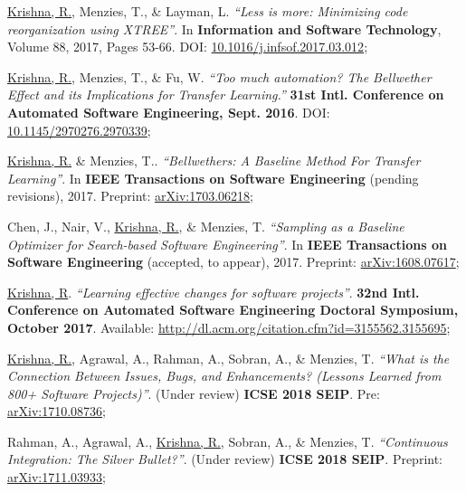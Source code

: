 \documentclass[letterpaper,9pt]{article}
\begin{document}
\begin{enumerate}[label={[\arabic*]}, leftmargin=15pt]

    \item\small \underline{Krishna, R.}, Menzies, T., \& Layman, L. 
    \textit{``Less is more: Minimizing code reorganization using XTREE''}. In 
    \textbf{Information and Software Technology}, Volume 88, 2017, Pages 53-66. 
    DOI:  
    \href{https://arxiv.org/abs/1609.03614}{10.1016/j.infsof.2017.03.012}\vspace{-6pt};
    
    \item\small  \underline{Krishna, R.}, Menzies, T., \& Fu, W. \textit{``Too 
    much automation? The Bellwether Effect and its Implications for Transfer 
    Learning.''} \textbf{31st Intl. Conference on Automated Software 
    Engineering, Sept. 2016}. DOI: 
    \href{https://doi.org/10.1145/2970276.2970339}{10.1145/2970276.2970339}\vspace{-6pt};
    
    \item\small \underline{Krishna, R.} \& Menzies, T.. \textit{``Bellwethers: 
    A Baseline Method For Transfer Learning''}. In\textbf{ IEEE Transactions on 
    Software Engineering} (pending revisions), 2017. Preprint: 
    \href{https://arxiv.org/abs/1703.06218}{arXiv:1703.06218}\vspace{-6pt};
    
    \item\small Chen, J., Nair, V., \underline{Krishna, R.}, \& Menzies, T. 
    \textit{``Sampling as a Baseline Optimizer for Search-based Software 
    Engineering''}. In \textbf{IEEE Transactions on Software Engineering} 
    (accepted, to appear), 2017. Preprint: 
    \href{https://arxiv.org/abs/1608.07617}{arXiv:1608.07617}\vspace{-6pt};
    
    \item\small \underline{Krishna, R}. \textit{``Learning effective changes 
    for software projects''}. \textbf{32nd Intl. Conference on Automated 
    Software Engineering Doctoral Symposium, October 2017}. Available: 
    \href{https://arxiv.org/abs/1708.04589}{http://dl.acm.org/citation.cfm?id=3155562.3155695}\vspace{-6pt};
    
    \item\small \underline{Krishna, R.}, Agrawal, A., Rahman, A., Sobran, A., 
    \& Menzies, T. \textit{``What is the Connection Between Issues, Bugs, and 
    Enhancements? (Lessons Learned from 800+ Software Projects)''}. (Under 
    review) \textbf{ICSE 2018 SEIP}. Pre: 
    \href{https://arxiv.org/abs/1710.08736}{arXiv:1710.08736}\vspace{-6pt};
    
    \item\small Rahman, A., Agrawal, A., \underline{Krishna, R.}, Sobran, A., 
    \& Menzies, T. \textit{``Continuous Integration: The Silver Bullet?''}. 
    (Under review)\textbf{ ICSE 2018 SEIP}. 
    Preprint: 
    \href{https://arxiv.org/abs/1711.03933}{arXiv:1711.03933}\vspace{-6pt};
\end{enumerate}
\end{document}
